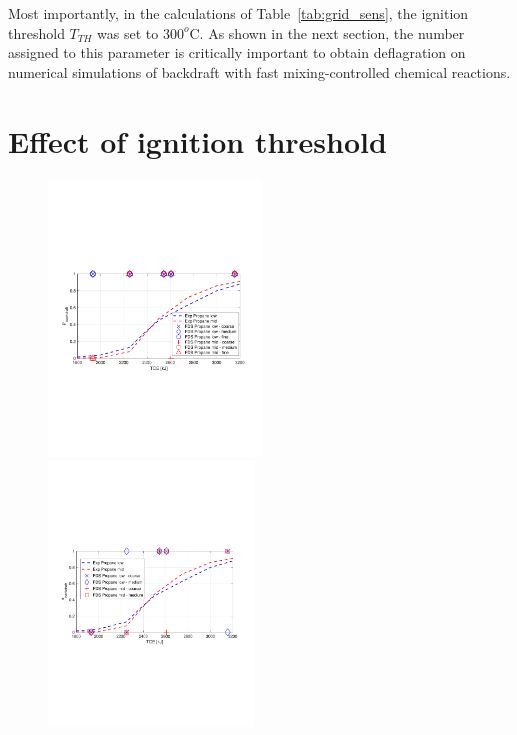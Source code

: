 \documentclass[12pt,letterpaper]{article}
\begin{document}
\begin{flushleft}
Most importantly, in the calculations of Table~\ref{tab:grid_sens}, the ignition threshold $T_{TH}$ was set to $300^o$C. As shown in the next section, the number assigned to this parameter is critically important to obtain deflagration on numerical simulations of backdraft with fast mixing-controlled chemical reactions.

\section{Effect of ignition threshold}
\label{sec:ign_thr}

%
\begin{figure}[tb]
    \centering
    \includegraphics[trim = 14.5mm 85mm 17mm 80mm, clip,width=0.505\textwidth]{IAFSS_Paper/Figures/PbvsTCE_Cign_LES_Extinction_2_TTH300_Propaneb.pdf}
    \includegraphics[trim = 22mm 85mm 17mm 80mm, clip,width=0.485\textwidth]{IAFSS_Paper/Figures/PbvsTCE_Cign_LES_Extinction_2_TTH325_Propaneb.pdf}

\end{figure}
\end{flushleft}
\end{document}
